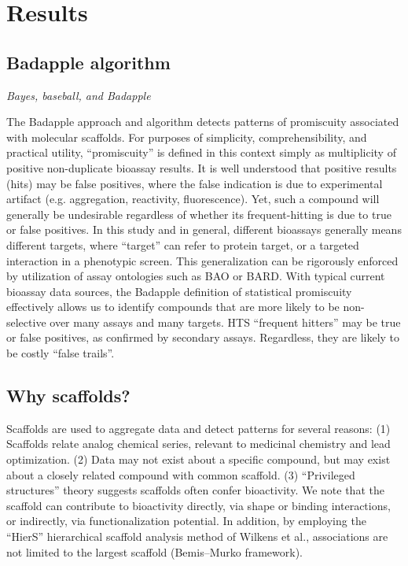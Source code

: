 \section{Results}

\subsection{Badapple algorithm}

\emph{Bayes, baseball, and Badapple}

The Badapple approach and algorithm detects patterns of promiscuity associated with molecular scaffolds. For purposes of simplicity, comprehensibility, and practical utility, “promiscuity” is defined in this context simply as multiplicity of positive non-duplicate bioassay results. It is well understood that positive results (hits) may be false positives, where the false indication is due to experimental artifact (e.g. aggregation, reactivity, fluorescence). Yet, such a compound will generally be undesirable regardless of whether its frequent-hitting is due to true or false positives. In this study and in general, different bioassays generally means different targets, where “target” can refer to protein target, or a targeted interaction in a phenotypic screen. This generalization can be rigorously enforced by utilization of assay ontologies such as BAO\cite{Vempati2012-ns} or BARD\cite{De_Souza2014-rf}. With typical current bioassay data sources, the Badapple definition of statistical promiscuity effectively allows us to identify compounds that are more likely to be non-selective over many assays and many targets. HTS “frequent hitters” may be true or false positives, as confirmed by secondary assays. Regardless, they are likely to be costly “false trails”.

\subsection{Why scaffolds?}

Scaffolds are used to aggregate data and detect patterns for several reasons: (1) Scaffolds relate analog chemical series, relevant to medicinal chemistry and lead optimization. (2) Data may not exist about a specific compound, but may exist about a closely related compound with common scaffold. (3) “Privileged structures” theory suggests scaffolds often confer bioactivity. We note that the scaffold can contribute to bioactivity directly, via shape or binding interactions, or indirectly, via functionalization potential. In addition, by employing the “HierS” hierarchical scaffold analysis method of Wilkens et al.\cite{Wilkens2005-ja}, associations are not limited to the largest scaffold (Bemis–Murko framework\cite{Bemis1996-jg}).

